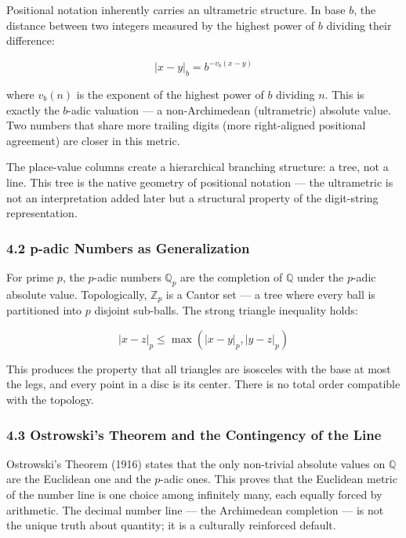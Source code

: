 \documentclass[
]{article}
\begin{document}
Positional notation inherently carries an ultrametric structure. In base
\(b\), the distance between two integers measured by the highest power
of \(b\) dividing their difference:

\[|x - y|_b = b^{-v_b(x-y)}\]

where \(v_b(n)\) is the exponent of the highest power of \(b\) dividing
\(n\). This is exactly the \(b\)-adic valuation --- a non-Archimedean
(ultrametric) absolute value. Two numbers that share more trailing
digits (more right-aligned positional agreement) are closer in this
metric.

The place-value columns create a hierarchical branching structure: a
tree, not a line. This tree is the native geometry of positional
notation --- the ultrametric is not an interpretation added later but a
structural property of the digit-string representation.

\subsubsection{4.2 p-adic Numbers as
Generalization}\label{p-adic-numbers-as-generalization}

For prime \(p\), the \(p\)-adic numbers \(\mathbb{Q}_p\) are the
completion of \(\mathbb{Q}\) under the \(p\)-adic absolute value.
Topologically, \(\mathbb{Z}_p\) is a Cantor set --- a tree where every
ball is partitioned into \(p\) disjoint sub-balls. The strong triangle
inequality holds:

\[|x - z|_p \leq \max(|x - y|_p, |y - z|_p)\]

This produces the property that all triangles are isosceles with the
base at most the legs, and every point in a disc is its center. There is
no total order compatible with the topology.

\subsubsection{4.3 Ostrowski's Theorem and the Contingency of the
Line}\label{ostrowskis-theorem-and-the-contingency-of-the-line}

Ostrowski's Theorem (1916) states that the only non-trivial absolute
values on \(\mathbb{Q}\) are the Euclidean one and the \(p\)-adic ones.
This proves that the Euclidean metric of the number line is one choice
among infinitely many, each equally forced by arithmetic. The decimal
number line --- the Archimedean completion --- is not the unique truth
about quantity; it is a culturally reinforced default.
\end{document}
